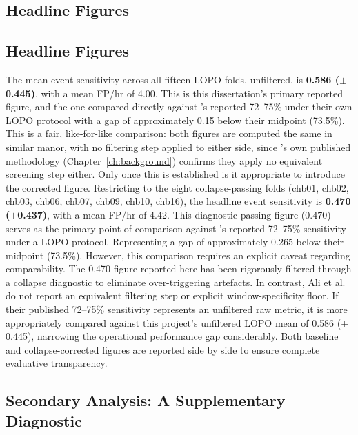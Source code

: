 \subsection{Headline Figures}

\subsection{Headline Figures}

The mean event sensitivity across all fifteen LOPO folds, unfiltered, is \textbf{0.586 ($\pm$0.445)}, with a mean FP/hr of 4.00. This is this dissertation's primary reported figure, and the one compared directly against \citet{ali2024}'s reported 72--75\% under their own LOPO protocol with a gap of approximately 0.15 below their midpoint (73.5\%). This is a fair, like-for-like comparison: both figures are computed the same in similar manor, with no filtering step applied to either side, since \citet{ali2024}'s own published methodology (Chapter~\ref{ch:background}) confirms they apply no equivalent screening step either.
Only once this is established is it appropriate to introduce the corrected figure. Restricting to the eight collapse-passing folds (chb01, chb02, chb03, chb06, chb07, chb09, chb10, 
chb16), the headline event sensitivity is \textbf{0.470 ($\pm$0.437)}, with a mean FP/hr of 4.42.
This diagnostic-passing figure ($0.470$) serves as the primary point of comparison against \citet{ali2024}'s reported 72--75\% sensitivity under a LOPO protocol. Representing a gap of approximately 0.265 below their midpoint (73.5\%). However, this comparison requires an explicit caveat regarding comparability. The 0.470 figure reported here has been rigorously filtered through a collapse diagnostic to eliminate over-triggering artefacts. In contrast, Ali et al. do not report an equivalent filtering step or explicit window-specificity floor. If their published 72--75\% sensitivity represents an unfiltered raw metric, it is more appropriately compared against this project's unfiltered LOPO mean of 0.586 ($\pm$0.445), narrowing the operational performance gap considerably. Both baseline and collapse-corrected figures are reported side by side to ensure complete evaluative transparency.

\subsection{Secondary Analysis: A Supplementary Diagnostic}
\label{sec:collapse-secondary}

